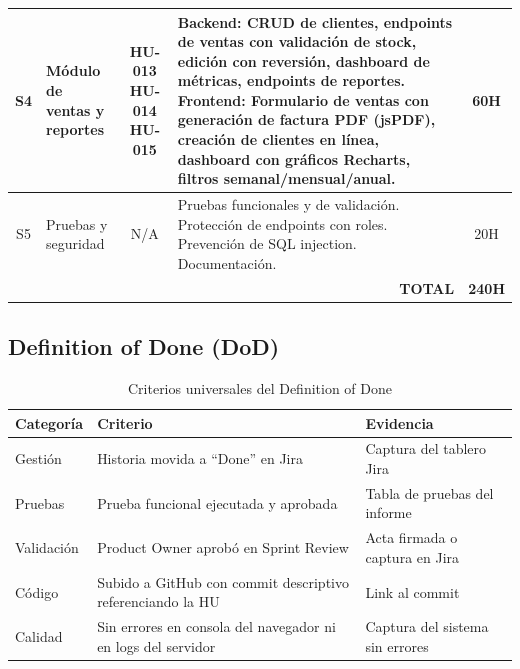 \documentclass[12pt, letterpaper]{report}
\begin{document}
\begin{longtable}{|c|p{3cm}|c|p{6cm}|c|}
S4 & Módulo de ventas y reportes & HU-013 \newline HU-014 \newline HU-015 & \textbf{Backend:} CRUD de clientes, endpoints de ventas con validación de stock, edición con reversión, dashboard de métricas, endpoints de reportes. \newline \textbf{Frontend:} Formulario de ventas con generación de factura PDF (jsPDF), creación de clientes en línea, dashboard con gráficos Recharts, filtros semanal/mensual/anual. & 60H \\ \hline
S5 & Pruebas y seguridad & N/A & Pruebas funcionales y de validación. Protección de endpoints con roles. Prevención de SQL injection. Documentación. & 20H \\ \hline
\multicolumn{4}{|r|}{\textbf{TOTAL}} & \textbf{240H} \\ \hline
\end{longtable}

\subsection{Definition of Done (DoD)}

\begin{table}[H]
\centering
\caption{Criterios universales del Definition of Done}
\renewcommand{\arraystretch}{1.3}
\begin{tabularx}{\textwidth}{|l|X|X|}
\hline
\textbf{Categoría} & \textbf{Criterio} & \textbf{Evidencia} \\ \hline
Gestión & Historia movida a ``Done'' en Jira & Captura del tablero Jira \\ \hline
Pruebas & Prueba funcional ejecutada y aprobada & Tabla de pruebas del informe \\ \hline
Validación & Product Owner aprobó en Sprint Review & Acta firmada o captura en Jira \\ \hline
Código & Subido a GitHub con commit descriptivo referenciando la HU & Link al commit \\ \hline
Calidad & Sin errores en consola del navegador ni en logs del servidor & Captura del sistema sin errores \\ \hline
\end{tabularx}
\end{table}
\end{document}
